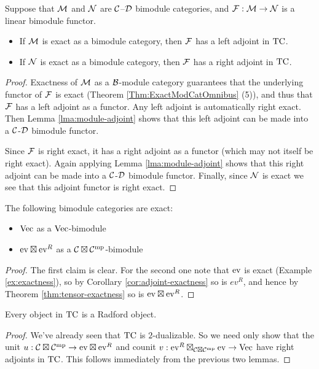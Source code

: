 \documentclass{amsart}
\begin{document}
\begin{lemma}
Suppose that $\cM$ and $\cN$ are $\cC$--$\cD$ bimodule categories, and $\cF: \cM \rightarrow \cN$ is a linear bimodule functor.
\begin{itemize}
\item If $\cM$ is exact as a bimodule category, then $\cF$ has a left adjoint in $\TC$.
\item If $\cN$ is exact as a bimodule category, then $\cF$ has a right adjoint in $\TC$.
\end{itemize}
\end{lemma}

\begin{proof}
Exactness of $\cM$ as a $\cB$-module category guarantees that the underlying functor of $\cF$ is exact (Theorem \ref{Thm:ExactModCatOmnibus} (5)), and thus that $\cF$ has a left adjoint as a functor.  Any left adjoint is automatically right exact.  Then Lemma \ref{lma:module-adjoint} shows that this left adjoint can be made into a $\cC$-$\cD$ bimodule functor.   

Since $\cF$ is right exact, it has a right adjoint as a functor (which may not itself be right exact).  Again applying Lemma \ref{lma:module-adjoint} shows that this right adjoint can be made into a $\cC$-$\cD$ bimodule functor.   Finally, since $\cN$ is exact we see that this adjoint functor is right exact.
\end{proof}

\begin{lemma}
The following bimodule categories are exact:
\begin{itemize}
\item $\Vec$ as a $\Vec$-bimodule
\item $\ev \boxtimes \ev^R$ as a $\cC \boxtimes \cC^\mp$-bimodule
\end{itemize}
\end{lemma}
\begin{proof}
The first claim is clear.  For the second one note that $\ev$ is exact (Example \ref{ex:exactness}), so by Corollary \ref{cor:adjoint-exactness} so is $ev^R$, and hence by Theorem \ref{thm:tensor-exactness} so is $\ev \boxtimes \ev^R$.
\end{proof}

\begin{theorem} \label{thm:TCisRadford}
Every object in $\TC$ is a Radford object.
\end{theorem}
\begin{proof}
We've already seen that $\TC$ is $2$-dualizable.  So we need only show that the unit $u: \cC \boxtimes \cC^\mp \rightarrow \ev \boxtimes \ev^R$ and counit $v: \ev^R \boxtimes_{\cC \boxtimes \cC^\mp} \ev \rightarrow \Vec$ have right adjoints in $\TC$.  This follows immediately from the previous two lemmas.
\end{proof}
\end{document}
